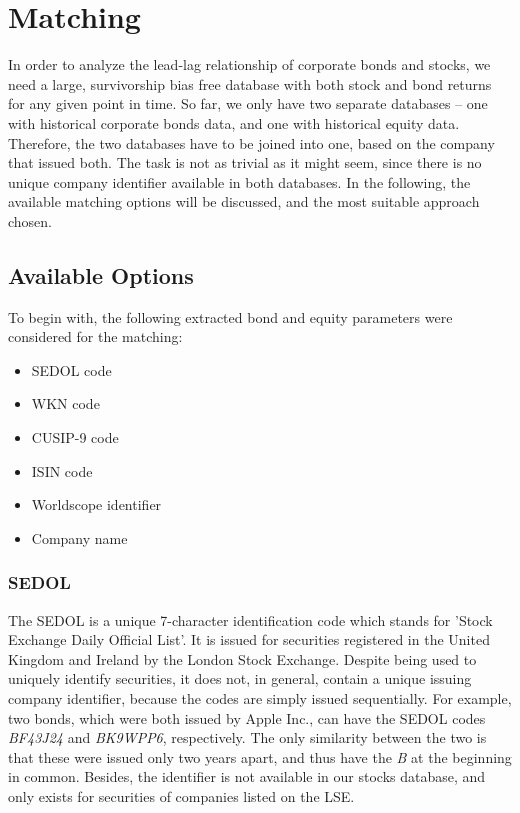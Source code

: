 \chapter{Matching} \label{chapter:matching}
In order to analyze the lead-lag relationship of corporate bonds and stocks, we need a large, survivorship bias free database with both stock and bond returns for any given point in time. So far, we only have two separate databases -- one with historical corporate bonds data, and one with historical equity data. Therefore, the two databases have to be joined into one, based on the company that issued both. The task is not as trivial as it might seem, since there is no unique company identifier available in both databases. In the following, the available matching options will be discussed, and the most suitable approach chosen. 

\section{Available Options}
To begin with, the following extracted bond and equity parameters were considered for the matching: 
\begin{itemize}
	\item SEDOL code
	\item WKN code
	\item CUSIP-9 code
	\item ISIN code
	\item Worldscope identifier
	\item Company name
\end{itemize}

\subsection{SEDOL} %
The SEDOL is a unique 7-character identification code which stands for 'Stock Exchange Daily Official List'. It is issued for securities registered in the United Kingdom and Ireland by the London Stock Exchange. Despite being used to uniquely identify securities, it does not, in general, contain a unique issuing company identifier, because the codes are simply issued sequentially. For example, two bonds, which were both issued by Apple Inc., can have the SEDOL codes \textit{BF43J24} and \textit{BK9WPP6}, respectively. The only similarity between the two is that these were issued only two years apart, and thus have the \textit{B} at the beginning in common. Besides, the identifier is not available in our stocks database, and only exists for securities of companies listed on the LSE. 

